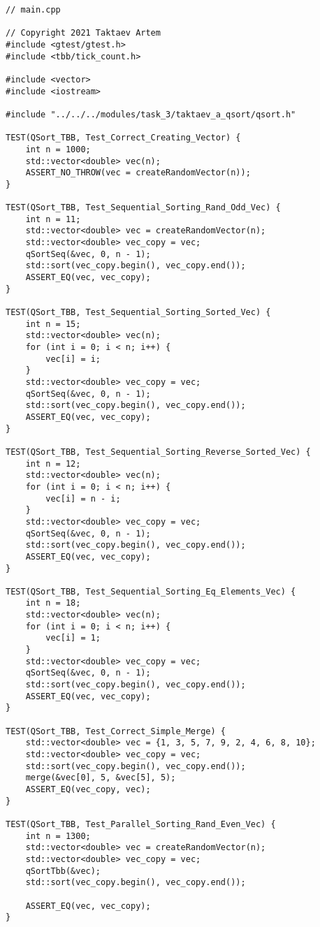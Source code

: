 \documentclass{report}
\begin{document}
\begin{lstlisting}
// main.cpp

// Copyright 2021 Taktaev Artem
#include <gtest/gtest.h>
#include <tbb/tick_count.h>

#include <vector>
#include <iostream>

#include "../../../modules/task_3/taktaev_a_qsort/qsort.h"

TEST(QSort_TBB, Test_Correct_Creating_Vector) {
    int n = 1000;
    std::vector<double> vec(n);
    ASSERT_NO_THROW(vec = createRandomVector(n));
}

TEST(QSort_TBB, Test_Sequential_Sorting_Rand_Odd_Vec) {
    int n = 11;
    std::vector<double> vec = createRandomVector(n);
    std::vector<double> vec_copy = vec;
    qSortSeq(&vec, 0, n - 1);
    std::sort(vec_copy.begin(), vec_copy.end());
    ASSERT_EQ(vec, vec_copy);
}

TEST(QSort_TBB, Test_Sequential_Sorting_Sorted_Vec) {
    int n = 15;
    std::vector<double> vec(n);
    for (int i = 0; i < n; i++) {
        vec[i] = i;
    }
    std::vector<double> vec_copy = vec;
    qSortSeq(&vec, 0, n - 1);
    std::sort(vec_copy.begin(), vec_copy.end());
    ASSERT_EQ(vec, vec_copy);
}

TEST(QSort_TBB, Test_Sequential_Sorting_Reverse_Sorted_Vec) {
    int n = 12;
    std::vector<double> vec(n);
    for (int i = 0; i < n; i++) {
        vec[i] = n - i;
    }
    std::vector<double> vec_copy = vec;
    qSortSeq(&vec, 0, n - 1);
    std::sort(vec_copy.begin(), vec_copy.end());
    ASSERT_EQ(vec, vec_copy);
}

TEST(QSort_TBB, Test_Sequential_Sorting_Eq_Elements_Vec) {
    int n = 18;
    std::vector<double> vec(n);
    for (int i = 0; i < n; i++) {
        vec[i] = 1;
    }
    std::vector<double> vec_copy = vec;
    qSortSeq(&vec, 0, n - 1);
    std::sort(vec_copy.begin(), vec_copy.end());
    ASSERT_EQ(vec, vec_copy);
}

TEST(QSort_TBB, Test_Correct_Simple_Merge) {
    std::vector<double> vec = {1, 3, 5, 7, 9, 2, 4, 6, 8, 10};
    std::vector<double> vec_copy = vec;
    std::sort(vec_copy.begin(), vec_copy.end());
    merge(&vec[0], 5, &vec[5], 5);
    ASSERT_EQ(vec_copy, vec);
}

TEST(QSort_TBB, Test_Parallel_Sorting_Rand_Even_Vec) {
    int n = 1300;
    std::vector<double> vec = createRandomVector(n);
    std::vector<double> vec_copy = vec;
    qSortTbb(&vec);
    std::sort(vec_copy.begin(), vec_copy.end());

    ASSERT_EQ(vec, vec_copy);
}


\end{lstlisting}
\end{document}
